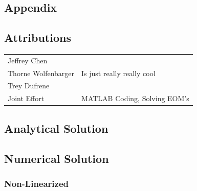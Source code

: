 \documentclass[12pt]{report}
\begin{document}
\begin{flushleft}
\section{Appendix} \label{appendix}

\subsection{Attributions}

\onehalfspacing
\begin{tabular}{ll}
Jeffrey Chen & \\
Thorne Wolfenbarger & Is just really really cool\\
Trey Dufrene & \\
Joint Effort & MATLAB Coding, Solving EOM's
\end{tabular}
\singlespacing

\subsection{Analytical Solution}
\newpage
\subsection{Numerical Solution} \label{appendix:numerical}
\subsubsection{Non-Linearized}


\end{flushleft}
\end{document}
